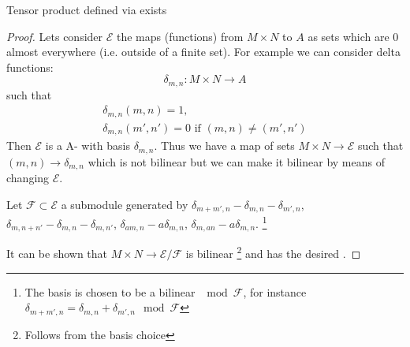 \begin{lemma}
  Tensor product defined via  exists
  \begin{proof}
    Lets consider $\mathcal{E}$ the maps (functions) from
    $M \times N$ to $A$ as sets which are $0$ almost everywhere
    (i.e. outside of a finite set). For example we can consider delta
    functions:
    \[
    \delta_{m,n} : M \times N \to A
    \]
    such that
    \begin{eqnarray}
      \delta_{m,n}(m,n) = 1,
      \nonumber \\
      \delta_{m,n}(m',n') = 0 \mbox{ if } (m,n) \ne (m',n')
      \nonumber 
    \end{eqnarray}
    Then $\mathcal{E}$ is a A- with basis
    $\delta_{m,n}$. Thus we have a map of sets $M \times N \to
    \mathcal{E}$ such that $(m,n) \to \delta_{m,n}$ which is not bilinear
    but we can make it bilinear by means of changing $\mathcal{E}$.
    
    Let $\mathcal{F} \subset \mathcal{E}$ a submodule generated by
    $\delta_{m+m',n} - \delta_{m,n} - \delta_{m',n}$,
    $\delta_{m,n+n'} - \delta_{m,n} - \delta_{m,n'}$,
    $\delta_{am,n} - a\delta_{m,n}$,
    $\delta_{m,an} - a\delta_{m,n}$.
    \footnote{
      The basis is chosen to be a bilinear $\mod \mathcal{F}$, for instance
      $\delta_{m+m',n} = \delta_{m,n} + \delta_{m',n} \mod \mathcal{F}$
    }
    
    It can be shown that $M \times N \to \mathcal{E}/\mathcal{F}$ is
    bilinear
    \footnote{
      Follows from the basis choice
    }
    and has the desired .


\end{proof}
\end{lemma}
